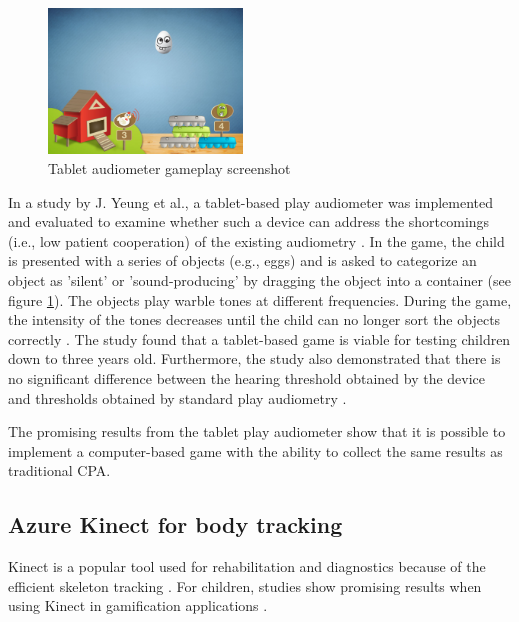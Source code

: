 \begin{figure}[h]
    \centering
    \includegraphics[width = 0.46\textwidth]{SMC2022_template_Latex/images/IpadAudiometry.png}
    \caption{Tablet audiometer gameplay screenshot \cite{ipadAudiometry}}
    \label{fig:ipadAudiometry}
\end{figure}

In a study by J. Yeung et al., a tablet-based play audiometer was implemented and evaluated to examine whether such a device can address the shortcomings (i.e., low patient cooperation) of the existing audiometry \cite{ipadAudiometry}. In the game, the child is presented with a series of objects (e.g., eggs) and is asked to categorize an object as 'silent' or 'sound-producing' by dragging the object into a container (see figure \ref{fig:ipadAudiometry}). The objects play warble tones at different frequencies. During the game, the intensity of the tones decreases until the child can no longer sort the objects correctly \cite{ipadAudiometry}. The study found that a tablet-based game is viable for testing children down to three years old. Furthermore, the study also demonstrated that there is no significant difference between the hearing threshold obtained by the device and thresholds obtained by standard play audiometry \cite{ipadAudiometry}. \newline 

The promising results from the tablet play audiometer show that it is possible to implement a computer-based game with the ability to collect the same results as traditional CPA.

\subsection{Azure Kinect for body tracking} \label{kinect}

Kinect is a popular tool used for rehabilitation and diagnostics because of the efficient skeleton tracking \cite{parkinsonKinect, balanceKinect, autismClassroom, tremorsKinect}. For children, studies show promising results when using Kinect in gamification applications \cite{autismGame, gamificationChildren}. 

